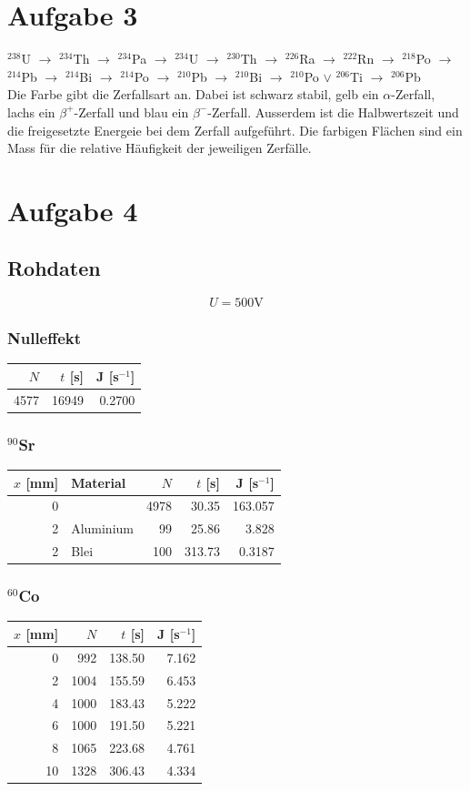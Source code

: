 \documentclass[12pt,a4paper]{article}
\begin{document}
\section*{Aufgabe 3}
$^{238}$U $\rightarrow$  $^{234}$Th $\rightarrow$  $^{234}$Pa $\rightarrow$  $^{234}$U $\rightarrow$  $^{230}$Th $\rightarrow$  $^{226}$Ra $\rightarrow$  $^{222}$Rn $\rightarrow$  $^{218}$Po $\rightarrow$  $^{214}$Pb $\rightarrow$  $^{214}$Bi $\rightarrow$  $^{214}$Po $\rightarrow$  $^{210}$Pb $\rightarrow$  $^{210}$Bi $\rightarrow$  $^{210}$Po $\lor$  $^{206}$Ti $\rightarrow$  $^{206}$Pb  \\
Die Farbe gibt die Zerfallsart an. Dabei ist schwarz stabil, gelb ein $\alpha$-Zerfall, lachs ein $\beta^+$-Zerfall und blau ein $\beta^-$-Zerfall. Ausserdem ist die Halbwertszeit und die freigesetzte Energeie bei dem Zerfall aufgef\"uhrt. Die farbigen Fl\"achen sind ein Mass f\"ur die relative H\"aufigkeit der jeweiligen Zerf\"alle.


\section*{Aufgabe 4}
\subsection*{Rohdaten}
\[ U = 500\mbox{V} \]
\subsubsection*{Nulleffekt}
\begin{tabular}{|r|r|r|}
\hline
$N$&$t$ [s]&J [s$^{-1}$]\\
\hline
4577&16949&0.2700\\
\hline
\end{tabular}

\subsubsection*{${}^{90}$Sr}
\begin{tabular}{|r|l|r|r|r|}
\hline
$x$ [mm]&Material&$N$&$t$ [s]&J [s$^{-1}$]\\
\hline
0&&4978&30.35&163.057\\
2&Aluminium&99&25.86&3.828\\
2&Blei&100&313.73&0.3187\\
\hline
\end{tabular}

\subsubsection*{${}^{60}$Co}
\begin{tabular}{|r|r|r|r|}
\hline
$x$ [mm]&$N$&$t$ [s]&J [s${}^{-1}$]\\
\hline
0&992&138.50&7.162\\
2&1004&155.59&6.453\\
4&1000&183.43&5.222\\
6&1000&191.50&5.221\\
8&1065&223.68&4.761\\
10&1328&306.43&4.334\\
\hline
\end{tabular}
\end{document}
